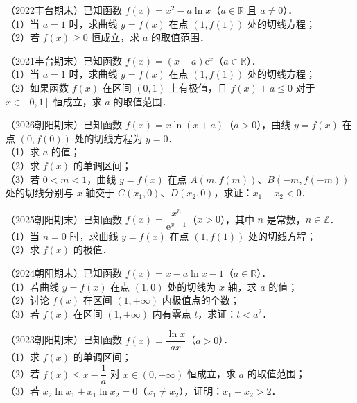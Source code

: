 \begin{example}
（2022丰台期末）已知函数 $f(x)=x^2-a\ln x$（$a\in\mathbb{R}$ 且 $a\neq0$）．\\
（1）当 $a=1$ 时，求曲线 $y=f(x)$ 在点 $(1,f(1))$ 处的切线方程；\\
（2）若 $f(x)\geqslant0$ 恒成立，求 $a$ 的取值范围．
\end{example}

\begin{example}
（2021丰台期末）已知函数 $f(x)=(x-a)\mathrm{e}^x$（$a\in\mathbb{R}$）．\\
（1）当 $a=1$ 时，求曲线 $y=f(x)$ 在点 $(1,f(1))$ 处的切线方程；\\
（2）如果函数 $f(x)$ 在区间 $(0,1)$ 上有极值，且 $f(x)+a\leqslant0$ 对于 $x\in[0,1]$ 恒成立，求 $a$ 的取值范围．
\end{example}

\begin{example}
（2026朝阳期末）已知函数 $f(x)=x\ln(x+a)$（$a>0$），曲线 $y=f(x)$ 在点 $(0,f(0))$ 处的切线方程为 $y=0$．\\
（1）求 $a$ 的值；\\
（2）求 $f(x)$ 的单调区间；\\
（3）若 $0<m<1$，曲线 $y=f(x)$ 在点 $A(m,f(m))$、$B(-m,f(-m))$ 处的切线分别与 $x$ 轴交于 $C(x_1,0)$、$D(x_2,0)$，求证：$x_1+x_2<0$．
\end{example}

\begin{example}
（2025朝阳期末）已知函数 $f(x)=\dfrac{x^n}{\mathrm{e}^{x-1}}$（$x>0$），其中 $n$ 是常数，$n\in\mathbb{Z}$．\\
（1）当 $n=0$ 时，求曲线 $y=f(x)$ 在点 $(1,f(1))$ 处的切线方程；\\
（2）求 $f(x)$ 的极值．
\end{example}

\begin{example}
（2024朝阳期末）已知函数 $f(x)=x-a\ln x-1$（$a\in\mathbb{R}$）．\\
（1）若曲线 $y=f(x)$ 在点 $(1,0)$ 处的切线为 $x$ 轴，求 $a$ 的值；\\
（2）讨论 $f(x)$ 在区间 $(1,+\infty)$ 内极值点的个数；\\
（3）若 $f(x)$ 在区间 $(1,+\infty)$ 内有零点 $t$，求证：$t<a^2$．
\end{example}

\begin{example}
（2023朝阳期末）已知函数 $f(x)=\dfrac{\ln x}{ax}$（$a>0$）．\\
（1）求 $f(x)$ 的单调区间；\\
（2）若 $f(x)\leqslant x-\dfrac1a$ 对 $x\in(0,+\infty)$ 恒成立，求 $a$ 的取值范围；\\
（3）若 $x_2\ln x_1+x_1\ln x_2=0$（$x_1\neq x_2$），证明：$x_1+x_2>2$．
\end{example}

